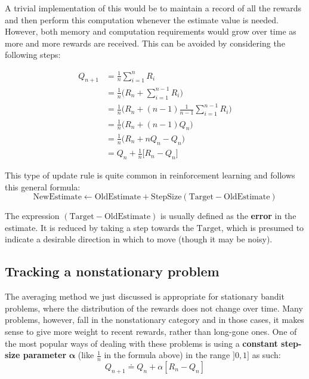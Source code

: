 A trivial implementation of this would be to maintain a record of all the rewards and then perform this computation whenever the estimate value is needed. However, both memory and computation requirements would grow over time as more and more rewards are received. This can be avoided by considering the following steps:

\begin{equation*}
    \begin{split}
        Q_{n+1} & = \frac{1}{n} \sum_{i=1}^{n} R_i\\
        & = \frac{1}{n} \Big( R_n + \sum_{i=1}^{n-1} R_i \Big) \\
        & = \frac{1}{n} \Big( R_n + (n-1) \frac{1}{n-1} \sum_{i=1}^{n-1} R_i \Big) \\
        & = \frac{1}{n} \Big( R_n + (n-1) Q_n \Big) \\
        & = \frac{1}{n} \Big( R_n + n Q_n - Q_n \Big) \\
        & = Q_n + \frac{1}{n} \Big[R_n - Q_n \Big]
    \end{split}
\end{equation*}

This type of update rule is quite common in reinforcement learning and follows this general formula:
\begin{equation*}
    \text{NewEstimate} \leftarrow \text{OldEstimate} + \text{StepSize}(\text{Target} - \text{OldEstimate})
\end{equation*}

The expression $(\text{Target} - \text{OldEstimate})$ is usually defined as the \textbf{error} in the estimate. It is reduced by taking a step towards the $\text{Target}$, which is presumed to indicate a desirable direction in which to move (though it may be noisy).

\subsection{Tracking a nonstationary problem}
The averaging method we just discussed is appropriate for stationary bandit problems, where the distribution of the rewards does not change over time. Many problems, however, fall in the nonstationary category and in those cases, it makes sense to give more weight to recent rewards, rather than long-gone ones. One of the most popular ways of dealing with these problems is using a \textbf{constant step-size parameter} $\boldsymbol{\alpha}$ (like $\frac{1}{n}$ in the formula above) in the range $]0,1]$ as such:
\begin{equation}
    Q_{n+1} \doteq Q_n + \alpha \left[R_n - Q_n \right]
    \label{eq:ch3-nonstationaryincrementalupdaterule}
\end{equation}

